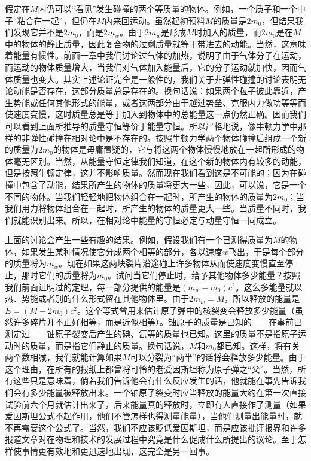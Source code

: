 假定在$M$内仍可以“看见”发生碰撞的两个等质量的物体。例如，一个质子和一个中子“粘合在一起”，但仍在$M$内来回运动。虽然起初预料$M$的质量是$2m_0$，但结果我们发现它并不是$2m_0$，而是$2m_w$。由于$2m_w$是形成$M$时加入的质量，而$2m_0$是在$M$中的物体的静止质量，因此复合物的过剩质量就等于带进去的动能。当然，这意味着能量有惯性。前面一章中我们讨论过气体的加热，说明了由于气体分子在运动，而运动的物体质量增大，当我们对气体加入能量后，它的分子运动就加快，因而气体质量也变大。其实上述论证完全是一般性的，我们关于非弹性碰撞的讨论表明无论动能是否存在，这部分质量总是存在的。换句话说：如果两个粒子彼此靠近，产生势能或任何其他形式的能量，或者这两部分由于越过势垒、克服内力做功等等而使速度变慢，这时质量总是等于加入到物体中的总能量这一点仍然正确。因而我们可以看到上面所推导的质量守恒等价于能量守恒。所以严格地说，像牛顿力学中那样的非弹性碰撞在相对论中是不存在的。按照牛顿力学两个物体碰撞后组成一个新的质量为$2m_0$的物体是毋庸置疑的，它与将这两个物体慢慢地放在一起所形成的物体毫无区别。当然，从能量守恒定律我们知道，在这个新的物体内有较多的动能，但是按照牛顿定律，这并不影响质量。然而现在我们看到这是不可能的；因为在碰撞中包含了动能，结果所产生的物体的质量将更大一些，因此，可以说，它是一个不同的物体。当我们轻轻地把物体组合在一起时，所产生的物体的质量为$2m_0$；当我们用力将物体组合在一起时，所产生的物体的质量更大一些。当质量不同时，我们就能识别出来。所以，在相对论中能量的守恒必定与动量守恒一同成立。

上面的讨论会产生一些有趣的结果。例如，假设我们有一个已测得质量为$M$的物体，如果发生某种情况使它分成两个相等的部分，各以速度$w$飞出，于是每个部分的质量将为$m_w$。现在如果这两块裂片沿途碰上许多物体从而使速度变慢直至停止，那时它们的质量将为$m_0$。试问当它们停止时，给予其他物体多少能量？按照我们前面证明过的定理，每一部分提供的能量是$(m_w-m_0)c^2$。这么多能量就以热、势能或者别的什么形式留在其他物体里。由于$2m_w=M$，所以释放的能量是$E=(M-2m_0)c^2$。这个等式曾用来估计原子弹中的核裂变会释放多少能量（虽然许多碎片并不正好相等，而是近似相等）。铀原子的质量是已知的——在事前已测定过——铀原子裂变后产生的碘、氙等的质量也已知。这里的质量不是指原子运动时的质量，而是指它们静止的质量。换句话说，$M$和$m_0$都已知。这样，将有关两个数相减，我们就能计算如果$M$可以分裂为“两半”的话将会释放多少能量。由于这个理由，在所有的报纸上都曾将可怜的老爱因斯坦称为原子弹之“父”。当然，所有这些只是意味着，倘若我们告诉他会有什么反应发生的话，他就能在事先告诉我们会有多少能量被释放出来。一个铀原子裂变时应当释放的能量大约在第一次直接试验前六个月就估计出来了，后来能量真的释放时，立即有人直接作了测量（如果爱因斯坦公式不起作用，他们不管怎样也得测量能量），当他们测量出能量时，就不再需要这个公式了。当然，我们不应该贬低爱因斯坦，而是应该批评报界和许多报道文章对在物理和技术的发展过程中究竟是什么促成什么所提出的议论。至于怎样使事情更有效地和更迅速地出现，这完全是另一回事。

